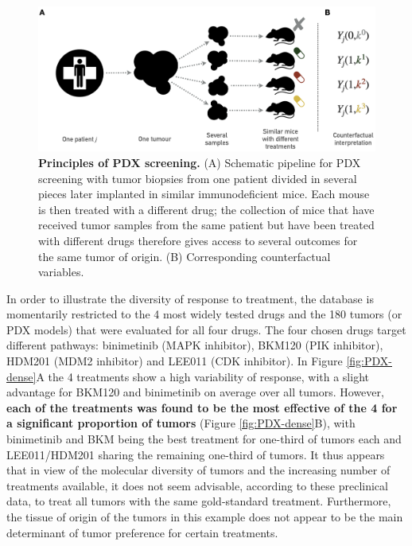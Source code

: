 \documentclass[a4paper,12pt,twoside,onecolumn,openright,final,oldfontcommands]{memoir}
\begin{document}
\begin{figure}

{\centering \includegraphics[width=0.9\linewidth]{fig/PDX} 

}

\caption[Principles of PDX screening]{\textbf{Principles of PDX screening.} (A)
Schematic pipeline for PDX screening with tumor biopsies from one
patient divided in several pieces later implanted in similar
immunodeficient mice. Each mouse is then treated with a different drug;
the collection of mice that have received tumor samples from the same
patient but have been treated with different drugs therefore gives
access to several outcomes for the same tumor of origin. (B)
Corresponding counterfactual variables.}\label{fig:PDX-principles}
\end{figure}










In order to illustrate the diversity of response to treatment, the
database is momentarily restricted to the 4 most widely tested drugs and
the 180 tumors (or PDX models) that were evaluated for all four drugs.
The four chosen drugs target different pathways: binimetinib (MAPK
inhibitor), BKM120 (PIK inhibitor), HDM201 (MDM2 inhibitor) and LEE011
(CDK inhibitor). In Figure \ref{fig:PDX-dense}A the 4 treatments show a
high variability of response, with a slight advantage for BKM120 and
binimetinib on average over all tumors. However, \textbf{each of the
treatments was found to be the most effective of the 4 for a significant
proportion of tumors} (Figure \ref{fig:PDX-dense}B), with binimetinib
and BKM being the best treatment for one-third of tumors each and
LEE011/HDM201 sharing the remaining one-third of tumors. It thus appears
that in view of the molecular diversity of tumors and the increasing
number of treatments available, it does not seem advisable, according to
these preclinical data, to treat all tumors with the same gold-standard
treatment. Furthermore, the tissue of origin of the tumors in this
example does not appear to be the main determinant of tumor preference
for certain treatments.
\end{document}

